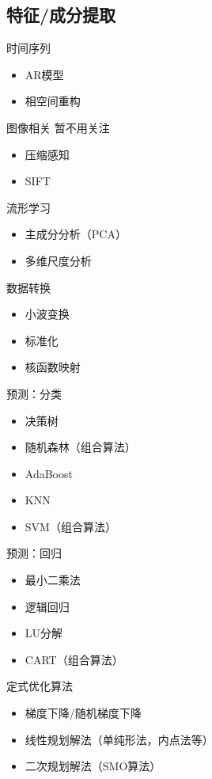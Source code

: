 \documentclass{beamer}
\begin{document}
\subsection{特征/成分提取}
\begin{frame}{时间序列}
\begin{itemize}
\item AR模型
\item 相空间重构
\end{itemize}
\end{frame}
\begin{frame}{图像相关}
暂不用关注
\begin{itemize}
\item 压缩感知
\item SIFT
\end{itemize}
\end{frame}
\begin{frame}{流形学习}
\begin{itemize}
\item 主成分分析（PCA）
\item 多维尺度分析
\end{itemize}
\end{frame}
\begin{frame}{数据转换}
\begin{itemize}
\item 小波变换
\item 标准化
\item 核函数映射
\end{itemize}
\end{frame}
\begin{frame}{预测：分类}
\begin{itemize}
\item 决策树
\item 随机森林（组合算法）
\item AdaBoost
\item KNN
\item SVM（组合算法）
\end{itemize}
\end{frame}
\begin{frame}{预测：回归}
\begin{itemize}
\item 最小二乘法
\item 逻辑回归
\item LU分解
\item CART（组合算法）
\end{itemize}
\end{frame}
\begin{frame}{定式优化算法}
\begin{itemize}
\item 梯度下降/随机梯度下降
\item 线性规划解法（单纯形法，内点法等）
\item 二次规划解法（SMO算法）
\end{itemize}
\end{frame}
\end{document}
